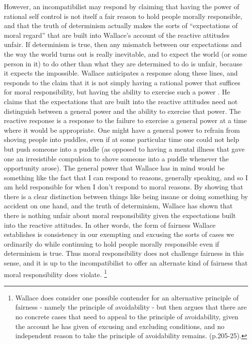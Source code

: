 \documentclass[phd,12pt,oneside,paper=letterpaper]{ubcthesis}
\begin{document}
However, an incompatibilist may respond by claiming that having the power of rational self control is not itself a fair reason to hold people morally responsible, and that the truth of determinism actually makes the sorts of ``expectations of moral regard'' that are built into Wallace's account of the reactive attitudes unfair. If determinism is true, then any mismatch between our expectations and the way the world turns out is really inevitable, and to expect the world (or some person in it) to do other than what they are determined to do is unfair, because it expects the impossible. 
Wallace anticipates a response along these lines, and responds to the claim that it is not simply having a rational power that suffices for moral responsibility, but having the ability to exercise such a power \citep[p.184-5]{wallace1994}. He claims that the expectations that are built into the reactive attitudes need not distinguish between a general power and the ability to exercise that power. The reactive response is a response to the failure to exercise a general power at a time where it would be appropriate. One might have a general power to refrain from shoving people into puddles, even if at some particular time one could not help but push someone into a puddle (as opposed to having a mental illness that gave one an irresistible compulsion to shove someone into a puddle whenever the opportunity arose). The general power that Wallace has in mind would be something like the fact that I can respond to reasons, generally speaking, and so I am held responsible for when I don't respond to moral reasons. By showing that there is a clear distinction between things like being insane or doing something by accident on one hand, and the truth of determinism, Wallace has shown that there is nothing unfair about moral responsibility given the expectations built into the reactive attitudes. In other words, the form of fairness Wallace establishes is consistency in our exempting and excusing the sorts of cases we ordinarily do while continuing to hold people morally responsible even if determinism is true. Thus moral responsibility does not challenge fairness in this sense, and it is up to the incompatibilist to offer an alternate kind of fairness that moral responsibility does violate. \footnote{Wallace does consider one possible contender for an alternative principle of fairness - namely the principle of avoidability - but then argues that there are no concrete cases that need to appeal to the principle of avoidability, given the account he has given of excusing and excluding conditions, and no independent reason to take the principle of avoidability remains. (p.205-25).}
\end{document}
